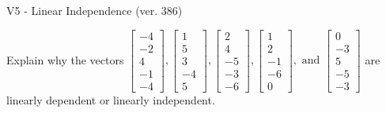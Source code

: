 \begin{exercise}
  \begin{exerciseTitle}V5 - Linear Independence (ver. 386)\end{exerciseTitle}
  \begin{exerciseStatement}
    Explain why the vectors \(\left[\begin{array}{r}
-4 \\
-2 \\
4 \\
-1 \\
-4
\end{array}\right] , \left[\begin{array}{r}
1 \\
5 \\
3 \\
-4 \\
5
\end{array}\right] , \left[\begin{array}{r}
2 \\
4 \\
-5 \\
-3 \\
-6
\end{array}\right] , \left[\begin{array}{r}
1 \\
2 \\
-1 \\
-6 \\
0
\end{array}\right] , \text{ and } \left[\begin{array}{r}
0 \\
-3 \\
5 \\
-5 \\
-3
\end{array}\right]\) are linearly dependent or linearly independent.	



\end{exerciseStatement}
\end{exercise}
